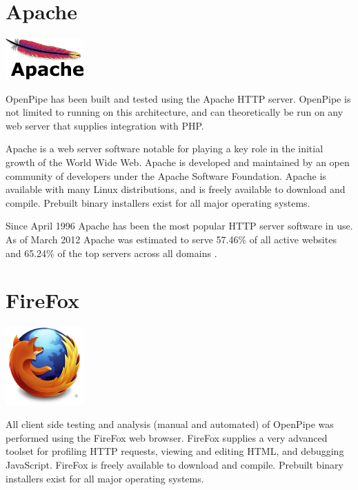 \documentclass[12pt]{report}
\begin{document}
\section{Apache}
\begin{center} 
\includegraphics[width=30mm]{figures/images/apache_logo.png}
\end{center}

OpenPipe has been built and tested using the Apache HTTP server. OpenPipe is not limited to running on this architecture, and can theoretically be run on any web server that supplies integration with PHP.

Apache is a web server software notable for playing a key role in the initial growth of the World Wide Web. Apache is developed and maintained by an open community of developers under the Apache Software Foundation. Apache is available with many Linux distributions, and is freely available to download and compile. Prebuilt binary installers exist for all major operating systems.  

Since April 1996 Apache has been the most popular HTTP server software in use. As of March 2012 Apache was estimated to serve 57.46\% of all active websites and 65.24\% of the top servers across all domains \cite{webserverSurvey}.


\section{FireFox}
\begin{center} 
\includegraphics[width=30mm]{figures/images/firefox_logo.png}
\end{center}

All client side testing and analysis (manual and automated) of OpenPipe was performed using the FireFox web browser. FireFox supplies a very advanced toolset for profiling HTTP requests, viewing and editing HTML, and debugging JavaScript. FireFox is freely available to download and compile. Prebuilt binary installers exist for all major operating systems. 
 
\end{document}
